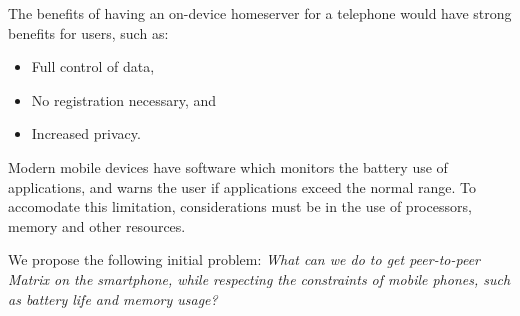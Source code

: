 The benefits of having an on-device homeserver for a telephone would have strong benefits for users, such as:
\begin{itemize}
    \item Full control of data,
    \item No registration necessary, and
    \item Increased privacy.
\end{itemize}

\noindent
Modern mobile devices have software which monitors the battery use of applications, and warns the user if applications exceed the normal range.
To accomodate this limitation, considerations must be in the use of processors, memory and other resources.

\begin{center}
    We propose the following initial problem: \textit{What can we do to get peer-to-peer Matrix on the smartphone, while respecting the constraints of mobile phones, such as battery life and memory usage?}
\end{center}

